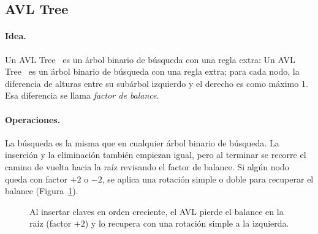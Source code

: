 \documentclass[11pt,a4paper]{article}
\begin{document}
\subsection{AVL Tree}

\paragraph{Idea.}
Un AVL Tree~\cite{avl1962} es un árbol binario de búsqueda con una regla extra:
Un AVL Tree~\cite{avl1962} es un árbol binario de búsqueda con una regla extra;
para cada nodo, la diferencia de alturas entre su subárbol izquierdo y el
derecho es como máximo 1. Esa diferencia se llama \emph{factor de balance}.

\paragraph{Operaciones.}
La búsqueda es la misma que en cualquier árbol binario de búsqueda. La
inserción y la eliminación también empiezan igual, pero al terminar se
recorre el camino de vuelta hacia la raíz revisando el factor de balance. Si
algún nodo queda con factor $+2$ o $-2$, se aplica una rotación simple o doble
para recuperar el balance (Figura~\ref{fig:avl}).

\begin{figure}[!htb]
\centering
{}
\caption{Al insertar claves en orden creciente, el AVL pierde el balance en la
raíz (factor $+2$) y lo recupera con una rotación simple a la izquierda.}
\label{fig:avl}
\end{figure}
\end{document}
